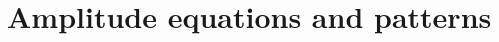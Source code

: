 \documentclass[11pt]{article}
\newcommand{\cQ}{\mathcal{Q}}
\begin{document}






\section{Amplitude equations and patterns}
\end{document}
